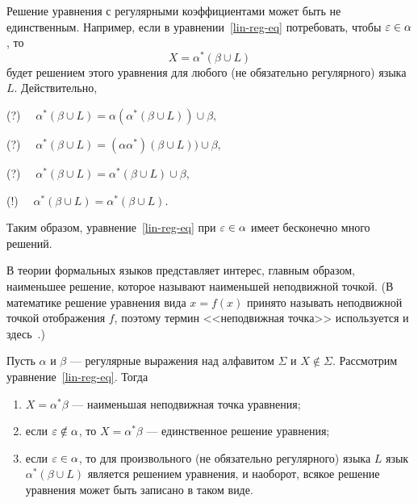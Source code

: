 Решение уравнения с регулярными коэффициентами может быть не единственным. Например, если в уравнении~\eqref{lin-reg-eq} потребовать, чтобы $\varepsilon\in\alpha$, то
\[
    X=\alpha^*(\beta\cup L)
\]
будет решением этого уравнения для любого (не обязательно регулярного) языка $L$. Действительно,

(?) $\quad \alpha^*(\beta\cup L)=\alpha(\alpha^*(\beta\cup L))\cup\beta,$

(?)	$\quad \alpha^*(\beta\cup L)=(\alpha\alpha^*)(\beta\cup L))\cup\beta,$

(?)	$\quad \alpha^*(\beta\cup L)=\alpha^*(\beta\cup L)\cup\beta,$

(!)	$\quad \alpha^*(\beta\cup L)=\alpha^*(\beta\cup L).$

Таким образом, уравнение~\eqref{lin-reg-eq} при $\varepsilon \in \alpha$
имеет бесконечно много решений.

В теории формальных языков представляет интерес, главным образом, наименьшее решение, которое называют наименьшей неподвижной точкой. (В математике решение уравнения вида $x=f(x)$ принято называть неподвижной точкой отображения $f$, поэтому термин <<неподвижная точка>> используется и здесь~\cite{Bau}.)

\begin{mytheorem}
\label{Theorem-NNT-EQ}
Пусть $\alpha$ и $\beta$ --- регулярные выражения над алфавитом $\Sigma$ и $X\notin\Sigma$. Рассмотрим уравнение~\eqref{lin-reg-eq}. Тогда
\begin{enumerate}
    \item $X=\alpha^*\beta$ --- наименьшая неподвижная точка уравнения;

    \item если $\varepsilon\notin\alpha$, то $X=\alpha^*\beta$ --- единственное
    решение уравнения;

    \item если $\varepsilon\in\alpha$, то для произвольного (не обязательно
    регулярного) языка $L$ язык $\alpha^*(\beta\cup L)$ является
    решением уравнения, и наоборот, всякое решение уравнения
    может быть записано в таком виде.
\end{enumerate}
\end{mytheorem}

